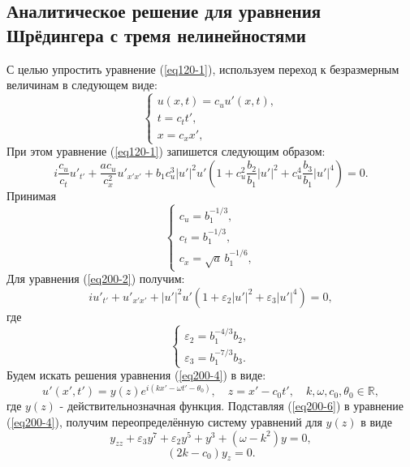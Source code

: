 \documentclass[12pt,a4paper]{article}
\begin{document}
\subsection{Аналитическое решение для уравнения Шрёдингера с тремя нелинейностями}\label{ch210}
	С целью упростить уравнение (\ref{eq120-1}), используем переход к безразмерным величинам в следующем виде:
	\begin{equation} \label{eq200-1}
		\begin{cases}
		u(x,t)=c_{u} u'(x,t),\\
		t=c_{t} t',\\
		x=c_{x}x',
		\end{cases}
	\end{equation}
	При этом уравнение (\ref{eq120-1}) запишется следующим образом:
	\begin{equation}\label{eq200-2}
		i\frac{c_{u}}{c_{t}}u'_{t'}+\frac{a c_{u}}{c_{x}^{2}}u'_{x'x'}+b_{1}c_{u}^{3}|u'|^2 u'\left(1+c_{u}^{2}\frac{b_{2}}{b_{1}}|u'|^2+c_{u}^{4}\frac{b_{3}}{b_{1}}|u'|^4\right)=0.
	\end{equation}
	Принимая
	\begin{equation} \label{eq200-3}
		\begin{cases}
		c_{u} = b_{1}^{-1/3},\\
		c_{t} = b_{1}^{-1/3},\\
		c_{x} = \sqrt{a} \,b_{1}^{-1/6},
		\end{cases}
	\end{equation}
	Для уравнения (\ref{eq200-2}) получим:
	\begin{equation}\label{eq200-4}
		iu'_{t'}+u'_{x'x'}+|u'|^2 u'\left(1+\varepsilon_{2}|u'|^2+\varepsilon_{3}|u'|^4\right)=0,
	\end{equation}
	где
	\begin{equation} \label{eq200-5}
		\begin{cases}
		\varepsilon_{2}=b_{1}^{-4/3}b_{2},\\
		\varepsilon_{3}=b_{1}^{-7/3}b_{3}.
		\end{cases}
	\end{equation}
	Будем искать решения уравнения (\ref{eq200-4}) в виде:
	\begin{equation}\label{eq200-6}
		u'(x',t')=y(z)e^{i(kx'-\omega t'-\theta_{0})}, \quad z=x'-c_{0}t',\quad k,\omega,c_{0},\theta_{0} \in \mathbb{R},
	\end{equation}
	где \(y(z)\) - действительнозначная функция. Подставляя (\ref{eq200-6}) в уравнение (\ref{eq200-4}), получим переопределённую систему уравнений для \(y(z)\) в виде
	\begin{equation} \label{eq200-7}
		y_{zz}+\varepsilon_{3} y^{7} +\varepsilon_{2} y^{5} + y^{3}+\left(\omega-k^{2}\right) y=0,
	\end{equation}
	\begin{equation} \label{eq200-8}
		(2 k-c_{0})y_{z}=0.
	\end{equation}
\end{document}
